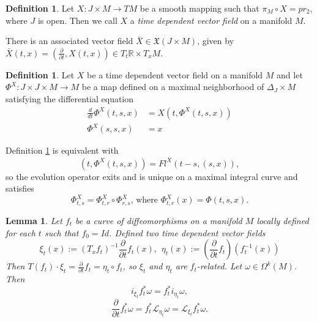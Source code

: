 \documentclass{article}
\newtheorem{lemma}[theorem]{Lemma} %
\theoremstyle{definition}
\newtheorem{definition}[theorem]{Definition}
\begin{document}
\begin{definition}
    Let $X: J \times M \rightarrow TM$ be a smooth mapping such that $\pi_M \circ X = pr_2$, where $J$ is open. Then we call $X$ a \textit{time dependent vector field} on a manifold $M$. 
\end{definition}
There is an associated vector field $\bar{X} \in \mathfrak{X}(J \times M)$, given by $\bar{X}(t, x)=(\frac{\partial}{\partial t}, X(t,x)) \in T_t\mathbb{R}\times T_xM$.

\begin{definition} \label{defEvolutionOperator}
    Let $X$ be a time dependent vector field on a manifold $M$ and let $\Phi^X: J \times J \times M \rightarrow M$ be a map defined on a maximal neighborhood of $\Delta_J\times M$ satisfying the differential equation
    \begin{equation}
        \begin{split}
            \frac{d}{d t} \Phi^X(t, s, x)&=X\left(t, \Phi^X(t, s, x)\right) \\ 
            \Phi^X(s,s,x) &= x
        \end{split}
    \end{equation}
\end{definition}
Definition \ref{defEvolutionOperator} is equivalent with 
\begin{equation*}
    (t,\Phi^X(t,s,x)) = Fl^{\bar{X}}(t-s, (s,x)),
\end{equation*}
so the evolution operator exits and is unique on a maximal integral curve and satisfies
\begin{equation*}
    \Phi_{t, s}^X=\Phi_{t, r}^X \circ \Phi_{r, s}^X \text{, where }\Phi_{t, r}^X(x) = \Phi(t,s,x).
\end{equation*}

\begin{lemma} \label{lemmaFlows}
    Let $f_t$ be a curve of diffeomorphisms on a manifold $M$ locally defined for each $t$ such that $f_0 = Id$. Defined two time dependent vector fields
    \begin{equation}
        \xi_t(x):=\left(T_x f_t\right)^{-1} \frac{\partial}{\partial t} f_t(x), \hspace{5pt} \eta_t(x):=\left(\frac{\partial}{\partial t} f_t\right)\left(f_t^{-1}(x)\right)
    \end{equation}
    Then $T\left(f_t\right) \cdot \xi_t=\frac{\partial}{\partial t} f_t=\eta_t \circ f_t$, so $\xi_t$ and $\eta_t$ are $f_t$-related. Let $\omega \in \Omega^k(M)$. Then
    \begin{equation}\label{eqFlows1}
        i_{\xi_t} f_t^* \omega=f_t^* i_{\eta_t} \omega, 
    \end{equation}
    \begin{equation}\label{eqFlows2}
        \frac{\partial}{\partial t} f_t^* \omega=f_t^* \mathcal{L}_{\eta_t} \omega=\mathcal{L}_{\xi_t} f_t^* \omega.
    \end{equation}
\end{lemma}
\end{document}
